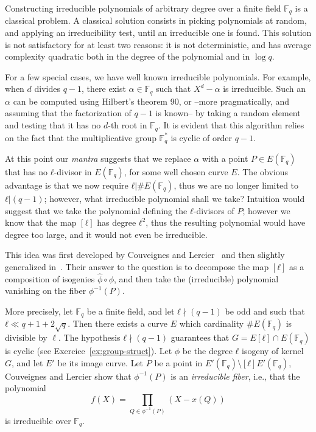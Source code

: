 \documentclass[10pt]{article}
\theoremstyle{plain}
\theoremstyle{definition}
\def\F{\ensuremath{\mathbb{F}}}
\begin{document}
Constructing irreducible polynomials of arbitrary degree over a finite
field $\F_q$ is a classical problem. %
A classical solution consists in picking polynomials at random, and
applying an irreducibility test, until an irreducible one is found. %
This solution is not satisfactory for at least two reasons: it is not
deterministic, and has average complexity quadratic both in the degree
of the polynomial and in $\log q$.

For a few special cases, we have well known irreducible polynomials. %
For example, when $d$ divides $q-1$, there exist $α∈\F_q$ such that
$X^d-α$ is irreducible. %
Such an $α$ can be computed using Hilbert's theorem 90, or --more
pragmatically, and assuming that the factorization of $q-1$ is known--
by taking a random element and testing that it has no $d$-th root in
$\F_q$. %
It is evident that this algorithm relies on the fact that the
multiplicative group $\F_q^*$ is cyclic of order $q-1$.

At this point our \emph{mantra} suggests that we replace $α$ with a
point $P∈E(\F_q)$ that has no $ℓ$-divisor in $E(\F_q)$, for some well
chosen curve $E$. %
The obvious advantage is that we now require $ℓ|\#E(\F_q)$, thus we
are no longer limited to $ℓ|(q-1)$; however, what irreducible
polynomial shall we take? %
Intuition would suggest that we take the polynomial defining the
$ℓ$-divisors of $P$; however we know that the map $[ℓ]$ has degree
$ℓ^2$, thus the resulting polynomial would have degree too large, and
it would not even be irreducible.

This idea was first developed by Couveignes and
Lercier~\cite{couveignes+lercier11} and then slightly generalized
in~\cite{DeDoSc13}. %
Their answer to the question is to decompose the map $[ℓ]$ as a
composition of isogenies $\hat{ϕ}∘ϕ$, and then take the (irreducible)
polynomial vanishing on the fiber $ϕ^{-1}(P)$.

More precisely, let $\F_q$ be a finite field, and let $ℓ\nmid(q-1)$ be
odd and such that $ℓ\ll q+1+2\sqrt{q}$. %
Then there exists a curve $E$ which cardinality $\#E(\F_q)$ is
divisible by $\ell$. %
The hypothesis $ℓ\nmid(q-1)$ guarantees that $G = E[ℓ]∩E(\F_q)$ is
cyclic (see Exercice~\ref{ex:group-struct}). %
Let $ϕ$ be the degree $ℓ$ isogeny of kernel $G$, and let $E'$ be its
image curve. %
Let $P$ be a point in $E'(\F_q)\setminus [ℓ]E'(\F_q)$, Couveignes and
Lercier show that $\phi^{-1}(P)$ is an \emph{irreducible fiber}, i.e.,
that the polynomial
\[f(X) = \prod_{Q\in\phi^{-1}(P)}(X - x(Q))\]
is irreducible over $\F_q$.
\end{document}
